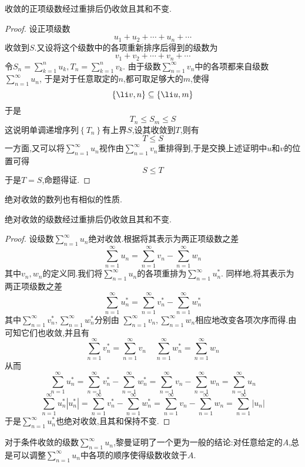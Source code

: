 \documentclass{ctexart}
\begin{document}
\begin{formal}[2.4 收敛的正项级数重排后仍收敛]
    收敛的正项级数经过重排后仍收敛且其和不变.
\end{formal}
\begin{proof}
    设正项级数
    \[u_1+u_2+\cdots+u_n+\cdots\]
    收敛到$S$.又设将这个级数中的各项重新排序后得到的级数为
    \[v_1+v_2+\cdots+v_n+\cdots\]
    令$\displaystyle S_n=\sum_{k=1}^{n}u_k,T_n=\sum_{k=1}^{n}v_k$.%
    由于级数$\displaystyle\sum_{n=1}^\infty v_n$中的各项都来自级数$\displaystyle\sum_{n=1}^\infty u_n$,%
    于是对于任意取定的$n$,都可取足够大的$m$,使得
    \[\left\{\li v,n\right\}\subseteq\left\{\li u,m\right\}\]
    于是
    \[T_n\leqslant S_m\leqslant S\]
    这说明单调递增序列$\left\{T_n\right\}$有上界$S$,设其收敛到$T$,则有
    \[T\leqslant S\]
    一方面,又可以将$\displaystyle\sum_{n=1}^\infty u_n$视作由$\displaystyle\sum_{n=1}^\infty v_n$重排得到,于是交换上述证明中$u$和$v$的位置可得
    \[S\leqslant T\]
    于是$T=S$,命题得证.
\end{proof}\noindent
绝对收敛的数列也有相似的性质.
\begin{formal}[2.5 绝对收敛的级数重排后仍收敛]
    绝对收敛的级数经过重排后仍收敛且其和不变.
\end{formal}
\begin{proof}
    设级数$\displaystyle\sum_{n=1}^\infty u_n$绝对收敛.根据将其表示为两正项级数之差
    \[\sum_{n=1}^\infty u_n=\sum_{n=1}^\infty v_n-\sum_{n=1}^\infty w_n\]
    其中$v_n,w_n$的定义同.我们将$\displaystyle\sum_{n=1}^\infty u_n$的各项重排为$\displaystyle\sum_{n=1}^\infty u_n^*$.%
    同样地,将其表示为两正项级数之差
    \[\sum_{n=1}^\infty u_n^*=\sum_{n=1}^\infty v_n^*-\sum_{n=1}^\infty w_n^*\]
    其中$\displaystyle\sum_{n=1}^\infty v_n^*,\sum_{n=1}^\infty w_n^*$分别由%
    $\sum_{n=1}^\infty v_n,\sum_{n=1}^\infty w_n$相应地改变各项次序而得.由可知它们也收敛,并且有
    \[\sum_{n=1}^\infty v_n^*=\sum_{n=1}^\infty v_n\ \ \ \ \ \sum_{n=1}^\infty w_n^*=\sum_{n=1}^\infty w_n\]
    从而
    \[\sum_{n=1}^\infty u_n^*=\sum_{n=1}^\infty v_n^*-\sum_{n=1}^\infty w_n^*=\sum_{n=1}^\infty v_n-\sum_{n=1}^\infty w_n=\sum_{n=1}^\infty u_n\]
    \[\sum_{n=1}^\infty u_n^*\left|u_n^*\right|=\sum_{n=1}^\infty v_n^*-\sum_{n=1}^\infty w_n^*=\sum_{n=1}^\infty v_n-\sum_{n=1}^\infty w_n=\sum_{n=1}^\infty \left|u_n\right|\]
    于是$\displaystyle\sum_{n=1}^\infty u_n^*$也绝对收敛,且其和保持不变.
\end{proof}\noindent
对于条件收敛的级数$\displaystyle\sum_{n=1}^\infty u_n$,黎曼证明了一个更为一般的结论:对任意给定的$A$,总是可以调整$\displaystyle\sum_{n=1}^\infty u_n$中各项的顺序使得级数收敛于$A$.
\end{document}
